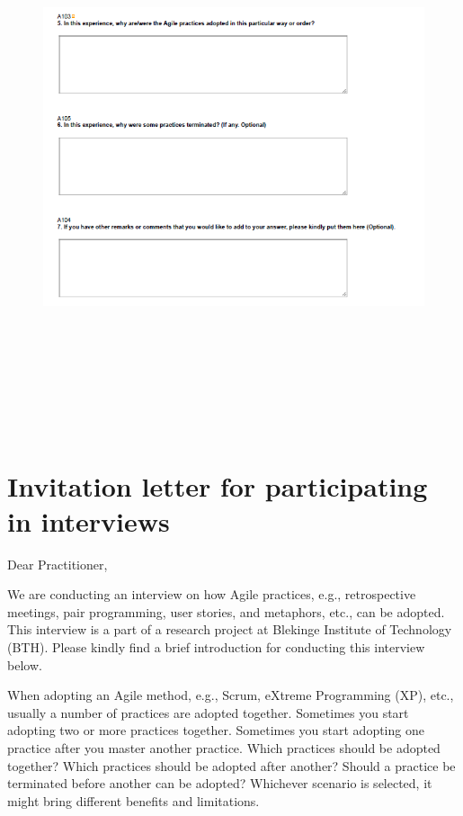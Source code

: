 \documentclass[a4paper,oneside]{bth}
\begin{document}
\begin{appendices}
\begin{figure}[h]
\end{figure}
\begin{figure}
\includegraphics[width=14cm, height=16cm]{Screenshot_4.png}
\end{figure}
\chapter{Invitation letter for participating in interviews} \label{appendix C}
Dear Practitioner,

We are conducting an interview on how Agile practices, e.g., retrospective meetings, pair programming, user stories, and metaphors, etc., can be adopted. This interview is a part of a research project at Blekinge Institute of Technology (BTH). Please kindly find a brief introduction for conducting this interview below.

When adopting an Agile method, e.g., Scrum, eXtreme Programming (XP), etc., usually a number of practices are adopted together. Sometimes you start adopting two or more practices together. Sometimes you start adopting one practice after you master another practice. Which practices should be adopted together? Which practices should be adopted after another? Should a practice be terminated before another can be adopted? Whichever scenario is selected, it might bring different benefits and limitations.


\end{appendices}
\end{document}
